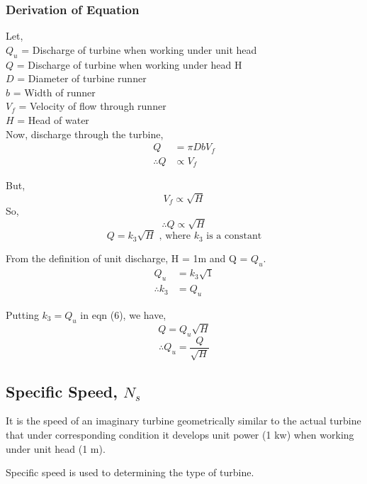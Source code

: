 \documentclass{article}
\begin{document}
\begin{multicols}{2}
      \subsubsection*{Derivation of Equation}
      Let,\\
      $Q_u$ = Discharge of turbine when working under unit head \\
      $Q$ = Discharge of turbine when working under head H \\
      $D$ = Diameter of turbine runner \\
      $b$ = Width of runner \\
      $V_f$ = Velocity of flow through runner \\
      $H$ = Head of water \\

      Now, discharge through the turbine,
      \begin{align*}
        Q &= \pi D b V_f \\
        \therefore Q &\propto V_f
      \end{align*}

      But, $$V_f \propto \sqrt{H}$$
      So, $$\therefore Q \propto \sqrt{H}$$
      \begin{equation}
        Q = k_3 \sqrt{H} \text{ , where $k_3$ is a constant}
      \end{equation}
      
      From the definition of unit discharge, H = 1m and Q = $Q_u$.
      \begin{align*}
        Q_u &= k_3 \sqrt{1} \\
        \therefore k_3 &= Q_u
      \end{align*}

      Putting $k_3 = Q_u$ in eqn (6), we have,
      $$Q = Q_u \sqrt{H}$$
      $$\therefore Q_u = \frac{Q}{\sqrt{H}}$$

      \subsection*{Specific Speed, $N_s$}
      It is the speed of an imaginary turbine geometrically similar to the actual turbine that under corresponding condition it develops unit power (1 kw) when working under unit head (1 m). 

      Specific speed is used to determining the type of turbine.


\end{multicols}
\end{document}

